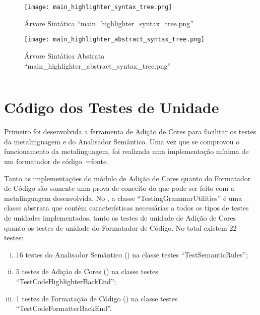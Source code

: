 \begin{figure}[!htb]
\caption{Árvore Sintática ``main\_highlighter\_syntax\_tree.png''}
\label{figure:MainHighlighterSyntaxTree}
\centering
\texttt{[image: main\_highlighter\_syntax\_tree.png]}
\end{figure}

\begin{figure}[!htb]
\caption{Árvore Sintática Abstrata ``main\_highlighter\_abstract\_syntax\_tree.png''}
\label{figure:MainHighlighterAbstractSyntaxTree}
\centering
\texttt{[image: main\_highlighter\_abstract\_syntax\_tree.png]}
\end{figure}

\begin{code}
\caption{Resultado da execução do arquivo ``source/main\_highlighter.py''}
\label{code:MainHighlighterPyResult}
\inputminted{text}{aftertext/main_highlighter_output.txt}
\end{code}


\chapter[Testes de Unidade]{Código dos Testes de Unidade}

Primeiro foi desenvolvida a ferramenta de Adição de Cores para facilitar os testes da metalinguagem e
do Analisador Semântico.
Uma vez que se comprovou o funcionamento da metalinguagem,
foi realizada uma implementação mínima de um formatador de código~=fonte.

Tanto as implementações do módulo de Adição de Cores quanto do Formatador de Código são somente uma prova de conceito do que pode ser feito com a metalinguagem desenvolvida.
No ,
a classe ``TestingGrammarUtilities'' é uma classe abstrata \cite{understandingDataAbstraction} que contém características necessárias a todos os tipos de testes de unidades implementados,
tanto os testes de unidade de Adição de Cores quanto os testes de unidade do Formatador de Código.
No total existem 22 testes:
\begin{enumerate}[i)]
\item 16 testes do Analisador Semântico () na classe testes ``TestSemanticRules'';
\item 5 testes de Adição de Cores () na classe testes ``TestCodeHighlighterBackEnd'';
\item 1 testes de Formatação de Código () na classe testes ``TestCodeFormatterBackEnd''.
\end{enumerate}%

